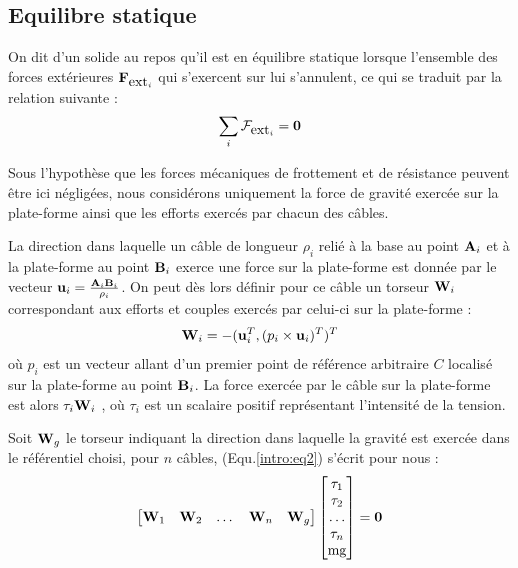 \subsection{Equilibre statique} \label{chap0-1-2}

On dit d'un solide au repos qu'il est en équilibre statique lorsque l'ensemble 
des forces extérieures $\mathcal {\bf F}_{\hbox{ext}_i}$ qui s'exercent sur lui 
s'annulent, ce qui se traduit par la relation suivante :
\begin{equation}
\sum_i \boldmath {\mathcal F}_{\hbox{ext}_i} = {\bf 0}
\label{intro:eq2}
\end{equation}

Sous l'hypothèse que les forces mécaniques de frottement et de résistance 
peuvent être ici négligées, nous considérons uniquement la force de gravité 
exercée sur la plate-forme ainsi que les efforts exercés par chacun des câbles.

La direction dans laquelle un câble de longueur $\rho_i$ relié à la base au 
point ${\bf A}_i$ et à la plate-forme au point ${\bf B}_i$ exerce une force sur 
la plate-forme est donnée par le vecteur ${\bf u}_i = \frac{{\bf A}_i{\bf 
B}_i}{\rho_i}$. On peut dès lors définir pour ce câble un torseur ${\bf W}_i$ 
correspondant aux efforts et couples exercés par celui-ci sur la plate-forme :
\begin{equation}
{\bf W}_i = -({\bf u}_i^T, (p_i \times {\bf u}_i)^T)^T
\label{intro:eq3}
\end{equation}
où $p_i$ est un vecteur allant d'un premier point de référence arbitraire 
$C$ localisé sur la plate-forme au point ${\bf B}_i$. La force exercée par le 
câble sur la plate-forme est alors $ \tau_i {\bf W}_i$ , où $\tau_i$ est un 
scalaire positif représentant l'intensité de la tension.

Soit ${\bf W}_g$ le torseur indiquant la direction dans laquelle la gravité est 
exercée dans le référentiel choisi, pour $n$ câbles, (Equ.\ref{intro:eq2}) 
s'écrit pour nous :
\begin{equation}
\begin{bmatrix}
 {\bf W}_1 & {\bf W}_2 & \dots & {\bf W}_n & {\bf W}_g
\end{bmatrix}
\begin{bmatrix}
 \tau_1 \\ \tau_2 \\ \dots \\ \tau_n \\ \hbox{mg}
\end{bmatrix}
= {\bf 0}
\label{intro:eq4}
\end{equation}

